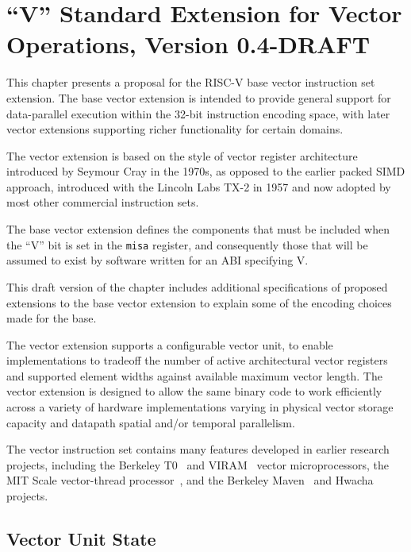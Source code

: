 \chapter{``V'' Standard Extension for Vector Operations, Version 0.4-DRAFT}
\label{sec:bits}

This chapter presents a proposal for the RISC-V base vector
instruction set extension.  The base vector extension is intended to
provide general support for data-parallel execution within the 32-bit
instruction encoding space, with later vector extensions supporting
richer functionality for certain domains.

\begin{commentary}
The vector extension is based on the style of vector register
architecture introduced by Seymour Cray in the 1970s, as opposed to
the earlier packed SIMD approach, introduced with the Lincoln Labs
TX-2 in 1957 and now adopted by most other commercial instruction
sets.
\end{commentary}

The base vector extension defines the components that must be included
when the ``V'' bit is set in the {\tt misa} register, and consequently
those that will be assumed to exist by software written for an ABI
specifying V.

\begin{commentary}
  This draft version of the chapter includes additional specifications
  of proposed extensions to the base vector extension to explain some
  of the encoding choices made for the base.
\end{commentary}

The vector extension supports a configurable vector unit, to enable
implementations to tradeoff the number of active architectural vector
registers and supported element widths against available maximum
vector length.  The vector extension is designed to allow the same
binary code to work efficiently across a variety of hardware
implementations varying in physical vector storage capacity and
datapath spatial and/or temporal parallelism.

\begin{commentary}
The vector instruction set contains many features developed in earlier
research projects, including the Berkeley T0~\cite{} and VIRAM~\cite{VIRAM}
vector microprocessors, the MIT Scale vector-thread processor~\cite{},
and the Berkeley Maven~\cite{} and Hwacha~\cite{} projects.
\end{commentary}

\section{Vector Unit State}

